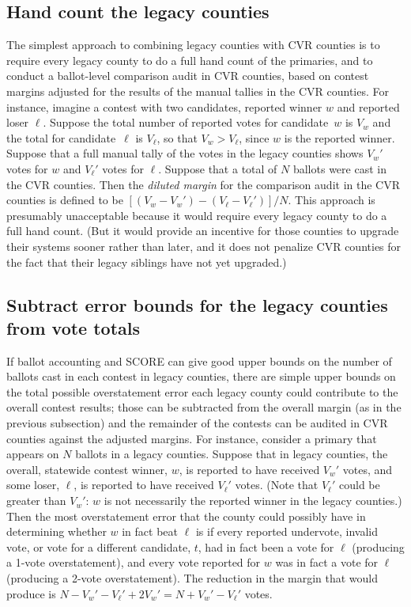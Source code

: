 \documentclass[12pt]{article}
\begin{document}
\subsection{Hand count the legacy counties}
The simplest approach to combining legacy counties with CVR counties is to require every
legacy county to do a full hand count of the primaries, and to conduct a 
ballot-level comparison audit in CVR counties, based on contest margins adjusted for
the results of the manual tallies in the CVR counties.
For instance, imagine a contest with two candidates, reported winner $w$ and reported loser $\ell$.
Suppose the total number of reported votes for candidate~$w$ is $V_w$ 
and the total for candidate~$\ell$ is $V_\ell$, so that $V_w > V_\ell$, since 
$w$ is the reported winner.
Suppose that a full manual tally of the votes in the legacy counties shows $V_w'$ votes for $w$ and
$V_\ell'$ votes for $\ell$.
Suppose that a total of $N$ ballots were cast in the CVR counties.
Then the \emph{diluted margin}  for the comparison audit in the CVR counties is defined to be
$[(V_w-V_w')-(V_\ell-V_\ell')]/N$.
This approach is presumably unacceptable because it would require every legacy county to do a full hand
count. 
(But it would provide an incentive for those counties to upgrade their systems
sooner rather than later, and it does not penalize CVR counties for the fact that their
legacy siblings have not yet upgraded.)

\subsection{Subtract error bounds for the legacy counties from vote totals}
If ballot accounting and SCORE can give good upper bounds on the number of ballots cast in
each contest in legacy counties, there are simple upper bounds on the total
possible overstatement error each legacy county could contribute to the overall contest
results; those can be subtracted from the overall margin (as in the previous subsection) and the
remainder of the contests can be audited in CVR counties against the adjusted margins.
For instance, consider a primary that appears on $N$ ballots in a legacy counties.
Suppose that in legacy counties, the overall, statewide contest winner, $w$, is reported to have received $V_w'$ votes, and some loser, $\ell$, is reported to have received $V_\ell'$ votes. 
(Note that $V_\ell'$ could be greater than $V_w'$: $w$ is not necessarily the reported winner in the legacy counties.)
Then the most overstatement error that the county could possibly have in determining whether
$w$ in fact beat $\ell$ is if every reported undervote, invalid vote, or vote for a different candidate, $t$, had 
in fact been a vote for $\ell$ (producing a 1-vote overstatement), and every vote reported for 
$w$ was in fact a vote for $\ell$ (producing a 2-vote overstatement).
The reduction in the margin that would produce is 
$N - V_w' - V_\ell' + 2V_w' = N + V_w' - V_\ell'$ votes.
\end{document}
